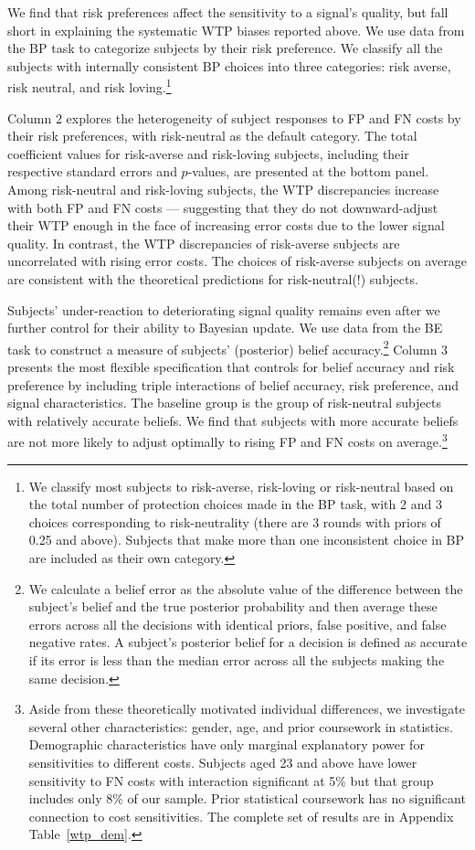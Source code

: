 \documentclass[12pt,a4paper]{article}
\begin{document}
We find that risk preferences affect the sensitivity to a signal's quality, but fall short in explaining the systematic WTP biases reported above. We use data from the BP task to categorize subjects by their risk preference. We classify all the subjects with internally consistent BP choices into three categories: risk averse, risk neutral, and risk loving.\footnote{We classify most subjects to risk-averse, risk-loving or risk-neutral based on the total number of protection choices made in the BP task, with 2 and 3 choices corresponding to risk-neutrality (there are 3 rounds with priors of 0.25 and above).  Subjects that make more than one inconsistent choice in BP are included as their own category.} 

Column 2 explores the heterogeneity of subject responses to FP and FN costs by their risk preferences, with risk-neutral as the default category. The total coefficient values for risk-averse and risk-loving subjects, including their respective standard errors and $p$-values, are presented at the bottom panel. Among risk-neutral and risk-loving subjects, the WTP discrepancies increase with both FP and FN costs --- suggesting that they do not downward-adjust their WTP enough in the face of increasing error costs due to the lower signal quality. In contrast, the WTP discrepancies of risk-averse subjects are uncorrelated with rising error costs. The choices of risk-averse subjects on average are consistent with the theoretical predictions for risk-neutral(!) subjects.

Subjects' under-reaction to deteriorating signal quality remains even after we further control for their ability to Bayesian update. We use data from the BE task to construct a measure of subjects' (posterior) belief accuracy.\footnote{We calculate a belief error as the absolute value of the difference between the subject's belief and the true posterior probability and then average these errors across all the decisions with identical priors, false positive, and false negative rates. A subject's posterior belief for a decision is defined as accurate if its error is less than the median error across all the subjects making the same decision.} Column 3 presents the most flexible specification that controls for belief accuracy and risk preference by including triple interactions of belief accuracy, risk preference, and signal characteristics. The baseline group is the group of risk-neutral subjects with relatively accurate beliefs. We find that subjects with more accurate beliefs are not more likely to adjust optimally to rising FP and FN costs on average.\footnote{Aside from these theoretically motivated individual differences, we investigate several other characteristics: gender, age, and prior coursework in statistics. Demographic characteristics have only marginal explanatory power for sensitivities to different costs. Subjects aged 23 and above have lower sensitivity to FN costs with interaction significant at 5\% but that group includes only 8\% of our sample. Prior statistical coursework has no significant connection to cost sensitivities.  The complete set of results are in Appendix Table~\ref{wtp_dem}.}
  
\end{document}
